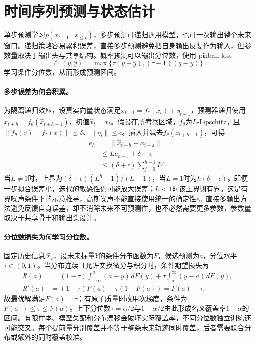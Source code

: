 \section{时间序列预测与状态估计}
单步预测学习$p(x_{t+1}\mid x_{\leq t})$，多步预测可递归调用模型，也可一次输出整个未来窗口。递归策略容易累积误差，直接多步预测避免把自身输出反复作为输入，但参数量取决于输出头与共享结构。概率预测可以输出分位数，使用 pinball loss
\begin{equation}
 \ell_\tau(y,\hat y)=\max\{\tau(y-\hat y),(\tau-1)(y-\hat y)\}
\end{equation}
学习条件分位数，从而形成预测区间。

\paragraph{多步误差为何会积累。}
为隔离递归效应，设真实向量状态满足$x_{t+1}=f_*(x_t)+\eta_{t+1}$，预测器递归使用$\hat x_{t+h}=f_\theta(\hat x_{t+h-1})$，初值$\hat x_t=x_t$。假设在所考察区域，$f_\theta$为$L$-Lipschitz，且$\|f_\theta(x)-f_*(x)\|\leq\delta$、$\|\eta_t\|\leq\epsilon$。插入并减去$f_\theta(x_{t+h-1})$，可得
\begin{align}
 e_h&=\|\hat x_{t+h}-x_{t+h}\|\\
 &\leq L e_{h-1}+\delta+\epsilon\\
 &\leq(\delta+\epsilon)\sum_{j=0}^{h-1}L^j.
\end{align}
当$L\ne1$时，上界为$(\delta+\epsilon)(L^h-1)/(L-1)$，当$L=1$时为$h(\delta+\epsilon)$。即便一步拟合误差小，迭代的敏感性仍可能放大误差；$L<1$时该上界则有界。这是有界噪声条件下的示意推导，高斯噪声不能直接使用统一的确定性$\epsilon$。直接多输出方法避免反馈自身误差，却不消除未来不可预测性，也不必然需要更多参数，参数量取决于共享骨干和输出头设计。

\paragraph{分位数损失为何学习分位数。}
固定历史信息$\mathcal F_t$，设未来标量$Y$的条件分布函数为$F$，候选预测为$a$，分位水平$\tau\in(0,1)$。当分布连续且允许交换微分与积分时，条件期望损失为
\begin{align}
 R(a)&=(1-\tau)\int_{-\infty}^{a}(a-y)\,dF(y)
       +\tau\int_a^\infty(y-a)\,dF(y),\\
 R'(a)&=(1-\tau)F(a)-\tau(1-F(a))=F(a)-\tau.
\end{align}
故最优解满足$F(a)=\tau$；有原子质量时改用次梯度，条件为$F(a^-)\leq\tau\leq F(a)$。上下分位数$\tau=\alpha/2$与$1-\alpha/2$由此形成名义覆盖率$1-\alpha$的区间。有限样本、模型失配和分布漂移会破坏实际覆盖率，不同分位数独立训练还可能交叉。每个提前量分别覆盖并不等于整条未来轨迹同时覆盖，后者需要联合分布或额外的同时覆盖校准。

